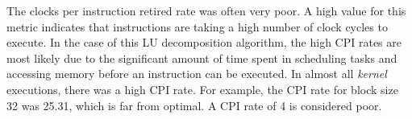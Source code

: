 \par{The clocks per instruction retired rate was often very poor. 
    A high value for this metric indicates that instructions are taking 
    a high number of clock cycles to execute. In the case of this LU 
    decomposition algorithm, the high CPI rates are most likely due 
    to the significant amount of time spent in scheduling tasks and 
    accessing memory before an instruction can be executed. 
    In almost all \emph{kernel} executions, there was a high CPI rate. 
    For example, the CPI rate for block size 32 was 25.31, which is far 
    from optimal. A CPI rate of 4 is considered poor.}
